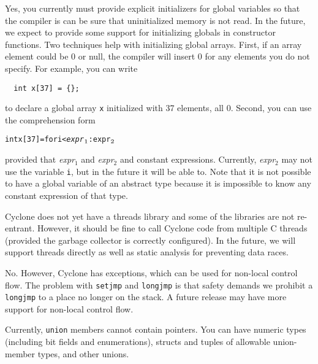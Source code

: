 Yes, you currently must provide explicit initializers for global
variables so that the compiler is can be sure that uninitialized
memory is not read.  In the future, we expect to provide some support
for initializing globals in constructor functions.  Two techniques
help with initializing global arrays.  First, if an array element
could be 0 or null, the compiler will insert 0 for any elements you do
not specify.  For example, you can write
\begin{verbatim}
  int x[37] = {};
\end{verbatim}
to declare a global array \texttt{x} initialized with 37 elements, all 0.
Second, you can use
the comprehension form
\begin{alltt}
  int x[37] = \lb for i < \textit{expr}\(\sb{1}\) : \texttt{expr}\(\sb{2}\) \rb
\end{alltt}
provided that 
\textit{expr}$_1$ and
\textit{expr}$_2$ and
constant expressions.
Currently, \textit{expr}$_2$ may not use the variable \texttt{i}, but
in the future it will be able to.  Note that it is not possible to
have a global variable of an abstract type because it is impossible to
know any constant expression of that type.


Cyclone does not yet have a threads library and some of the libraries
are not re-entrant.  However, it should be fine to call Cyclone code
from multiple C threads (provided the garbage collector is correctly
configured).  In the future, we will support threads directly as well
as static analysis for preventing data races.


No.  However, Cyclone has exceptions, which can be used for non-local
control flow.  The problem with \texttt{setjmp} and \texttt{longjmp}
is that safety demands we prohibit a \texttt{longjmp} to a place no
longer on the stack.  A future release may have more support for
non-local control flow.


Currently, \texttt{union} members cannot contain pointers.  You can
have numeric types (including bit fields and enumerations), structs
and tuples of allowable union-member types, and other unions.


